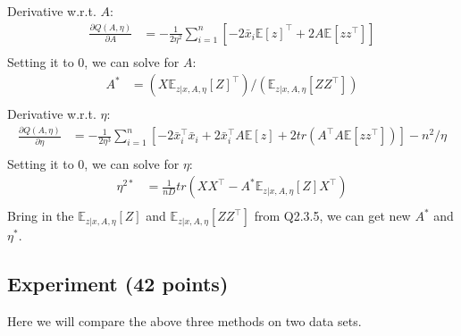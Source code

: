 \begin{enumerate}
\begin{soln}
  Derivative w.r.t. $A$:
  \begin{align*}
    \frac{\partial Q(A, \eta)}{\partial A} &= -\frac{1}{2 \eta^2} \sum_{i=1}^n \left[ -2 \bar{x}_i \mathbb{E}[z]^\top + 2 A \mathbb{E}[z z^\top] \right] \\
  \end{align*}
  Setting it to $0$, we can solve for $A$:
  \begin{align*}
    A^* &= (X \mathbb{E}_{z|x, A, \eta}[Z]^\top) / ( \mathbb{E}_{z|x, A, \eta}[Z Z^\top] ) \\
  \end{align*}
  Derivative w.r.t. $\eta$:
  \begin{align*}
    \frac{\partial Q(A, \eta)}{\partial \eta} &= -\frac{1}{2 \eta^3} \sum_{i=1}^n \left[ -2 \bar{x}_i^\top \bar{x}_i + 2 \bar{x}_i^\top A \mathbb{E}[z] + 2 tr(A^\top A \mathbb{E}[z z^\top])  \right] - n^2 / \eta \\
  \end{align*}
  Setting it to $0$, we can solve for $\eta$:
  \begin{align*}
    \eta^{2*} &= \frac{1}{nD} tr(XX^\top - A^* \mathbb{E}_{z|x, A, \eta}[Z] X^\top) \\
  \end{align*}
  Bring in the $\mathbb{E}_{z|x, A, \eta}[Z]$ and $\mathbb{E}_{z|x, A, \eta}[Z Z^\top]$ from Q2.3.5, we can get new $A^*$ and $\eta^*$.
\end{soln}

\end{enumerate}

 
\subsection{Experiment (42 points)}

Here we will compare the above three methods on two data sets. 

